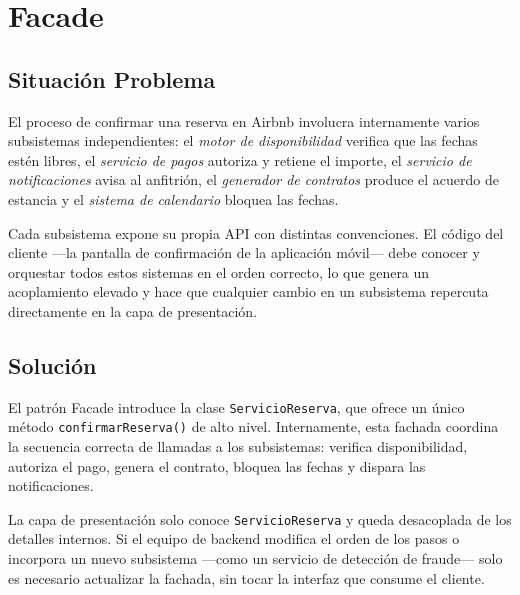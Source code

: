
\chapter{Facade}

\section{Situación Problema}

El proceso de confirmar una reserva en Airbnb involucra internamente
varios subsistemas independientes: el \emph{motor de disponibilidad}
verifica que las fechas estén libres, el \emph{servicio de pagos}
autoriza y retiene el importe, el \emph{servicio de notificaciones}
avisa al anfitrión, el \emph{generador de contratos} produce el acuerdo
de estancia y el \emph{sistema de calendario} bloquea las fechas.

Cada subsistema expone su propia API con distintas convenciones.
El código del cliente —la pantalla de confirmación de la aplicación móvil—
debe conocer y orquestar todos estos sistemas en el orden correcto, lo
que genera un acoplamiento elevado y hace que cualquier cambio en un
subsistema repercuta directamente en la capa de presentación.

\section{Solución}

El patrón Facade introduce la clase \texttt{ServicioReserva}, que ofrece
un único método \texttt{confirmarReserva()} de alto nivel. Internamente,
esta fachada coordina la secuencia correcta de llamadas a los subsistemas:
verifica disponibilidad, autoriza el pago, genera el contrato, bloquea
las fechas y dispara las notificaciones.

La capa de presentación solo conoce \texttt{ServicioReserva} y queda
desacoplada de los detalles internos. Si el equipo de backend modifica
el orden de los pasos o incorpora un nuevo subsistema —como un servicio
de detección de fraude— solo es necesario actualizar la fachada, sin
tocar la interfaz que consume el cliente.

